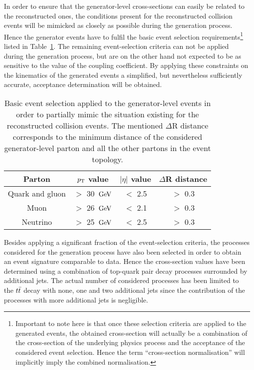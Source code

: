 In order to ensure that the generator-level cross-sections can easily be related to the reconstructed ones, the conditions present for the reconstructed collision events will be mimicked as closely as possible during the generation process. Hence the generator events have to fulfil the basic event selection requirements\footnote{Important to note here is that once these selection criteria are applied to the generated events, the obtained cross-section will actually be a combination of the cross-section of the underlying physics process and the acceptance of the considered event selection. Hence the term ``cross-section normalisation'' will implicitly imply the combined normalisation.} listed in Table~\ref{table::GenCuts}.
The remaining event-selection criteria can not be applied during the generation process, but are on the other hand not expected to be as sensitive to the value of the coupling coefficient.
By applying these constraints on the kinematics of the generated events a simplified, but nevertheless sufficiently accurate, acceptance determination will be obtained.
\begin{table}[h!t]
 \centering
 \caption{Basic event selection applied to the generator-level events in order to partially mimic the situation existing for the reconstructed collision events. The mentioned $\Delta$R distance corresponds to the minimum distance of the considered generator-level parton and all the other partons in the event topology.} \label{table::GenCuts}
 \renewcommand{\arraystretch}{1.2}
 \begin{tabular}{c|c|c|c}
  Parton 	& $p_{\rm T}$ value 		& $\vert \eta \vert$ value 	& $\Delta$R distance 	\\
  \hline
  Quark and gluon 		& $>$ 30 $\, \mathrm{GeV}$ 	& $<$ 2.5	& $>$ 0.3		\\
  Muon				& $>$ 26 $\, \mathrm{GeV}$		& $<$ 2.1	& $>$ 0.3		\\
  Neutrino 			& $>$ 25 $\, \mathrm{GeV}$		& $<$ 2.5	& $>$ 0.3		
 \end{tabular}
\end{table}

Besides applying a significant fraction of the event-selection criteria, the processes considered for the generation process have also been selected in order to obtain an event signature comparable to data.
Hence the cross-section values have been determined using a combination of top-quark pair decay processes surrounded by additional jets. 
The actual number of considered processes has been limited to the $t\bar{t}$ decay with none, one and two additional jets since the contribution of the processes with more additional jets is negligible.

